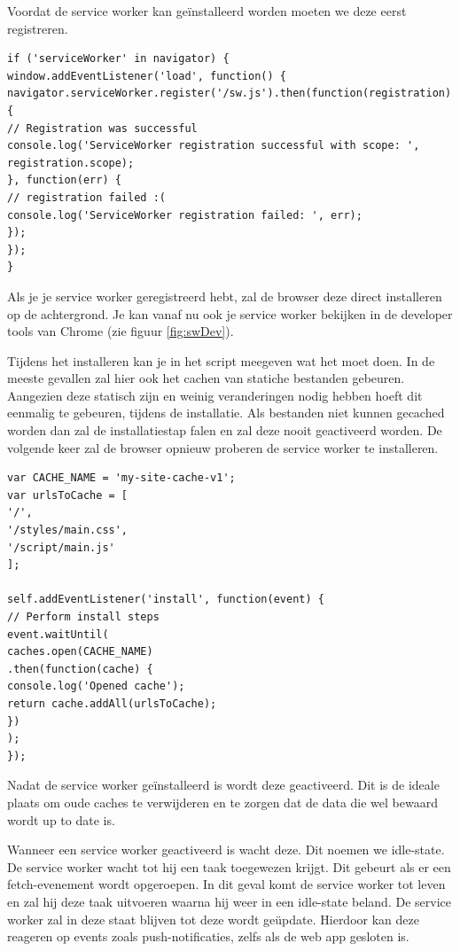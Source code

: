 	Voordat de service worker kan geïnstalleerd worden moeten we deze eerst registreren.
	
\begin{lstlisting}
if ('serviceWorker' in navigator) {
window.addEventListener('load', function() {
navigator.serviceWorker.register('/sw.js').then(function(registration) {
// Registration was successful
console.log('ServiceWorker registration successful with scope: ', registration.scope);
}, function(err) {
// registration failed :(
console.log('ServiceWorker registration failed: ', err);
});
});
}
\end{lstlisting}

Als je je service worker geregistreerd hebt, zal de browser deze direct installeren op de achtergrond. Je kan vanaf nu ook je service worker bekijken in de developer tools van Chrome (zie figuur \ref{fig:swDev}).

Tijdens het installeren kan je in het script meegeven wat het moet doen. In de meeste gevallen zal hier ook het cachen van statiche bestanden gebeuren. Aangezien deze statisch zijn en weinig veranderingen nodig hebben hoeft dit eenmalig te gebeuren, tijdens de installatie. Als bestanden niet kunnen gecached worden dan zal de installatiestap falen en zal deze nooit geactiveerd worden. De volgende keer zal de browser opnieuw proberen de service worker te installeren.
\begin{lstlisting}
var CACHE_NAME = 'my-site-cache-v1';
var urlsToCache = [
'/',
'/styles/main.css',
'/script/main.js'
];

self.addEventListener('install', function(event) {
// Perform install steps
event.waitUntil(
caches.open(CACHE_NAME)
.then(function(cache) {
console.log('Opened cache');
return cache.addAll(urlsToCache);
})
);
});
\end{lstlisting}


Nadat de service worker geïnstalleerd is wordt deze geactiveerd. Dit is de ideale plaats om oude caches te verwijderen en te zorgen dat de data die wel bewaard wordt up to date is.

Wanneer een service worker geactiveerd is wacht deze. Dit noemen we idle-state. De service worker wacht tot hij een taak toegewezen krijgt. Dit gebeurt als er een fetch-evenement wordt opgeroepen. In dit geval komt de service worker tot leven en zal hij deze taak uitvoeren waarna hij weer in een idle-state beland. De service worker zal in deze staat blijven tot deze wordt geüpdate. Hierdoor kan deze reageren op events zoals push-notificaties, zelfs als de web app gesloten is.


